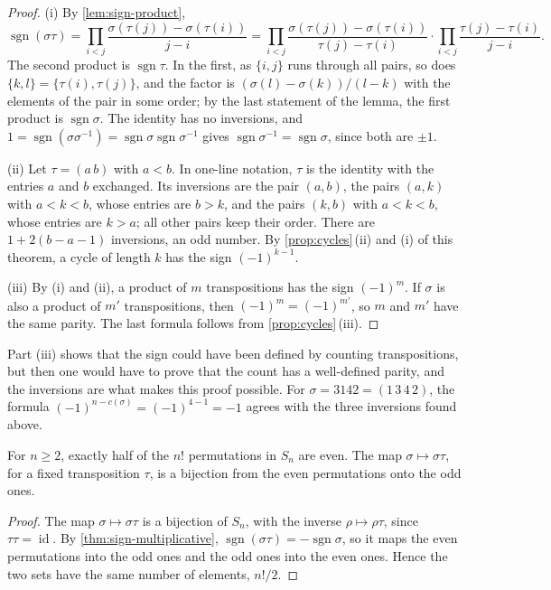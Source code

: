 \begin{proof}
(i) By \cref{lem:sign-product},
\[
\operatorname{sgn}(\sigma\tau)=\prod_{i<j}\frac{\sigma(\tau(j))-\sigma(\tau(i))}{j-i}=\prod_{i<j}\frac{\sigma(\tau(j))-\sigma(\tau(i))}{\tau(j)-\tau(i)}\cdot\prod_{i<j}\frac{\tau(j)-\tau(i)}{j-i}.
\]
The second product is $\operatorname{sgn}\tau$. In the first, as $\{i,j\}$ runs through all pairs, so does $\{k,l\}=\{\tau(i),\tau(j)\}$, and the factor is $(\sigma(l)-\sigma(k))/(l-k)$ with the elements of the pair in some order; by the last statement of the lemma, the first product is $\operatorname{sgn}\sigma$. The identity has no inversions, and $1=\operatorname{sgn}(\sigma\sigma^{-1})=\operatorname{sgn}\sigma\operatorname{sgn}\sigma^{-1}$ gives $\operatorname{sgn}\sigma^{-1}=\operatorname{sgn}\sigma$, since both are $\pm1$.

(ii) Let $\tau=(a\,b)$ with $a<b$. In one-line notation, $\tau$ is the identity with the entries $a$ and $b$ exchanged. Its inversions are the pair $(a,b)$, the pairs $(a,k)$ with $a<k<b$, whose entries are $b>k$, and the pairs $(k,b)$ with $a<k<b$, whose entries are $k>a$; all other pairs keep their order. There are $1+2(b-a-1)$ inversions, an odd number. By \cref{prop:cycles}\,(ii) and (i) of this theorem, a cycle of length $k$ has the sign $(-1)^{k-1}$.

(iii) By (i) and (ii), a product of $m$ transpositions has the sign $(-1)^m$. If $\sigma$ is also a product of $m'$ transpositions, then $(-1)^m=(-1)^{m'}$, so $m$ and $m'$ have the same parity. The last formula follows from \cref{prop:cycles}\,(iii).
\end{proof}

Part (iii) shows that the sign could have been defined by counting transpositions, but then one would have to prove that the count has a well-defined parity, and the inversions are what makes this proof possible. For $\sigma=3142=(1\,3\,4\,2)$, the formula $(-1)^{n-c(\sigma)}=(-1)^{4-1}=-1$ agrees with the three inversions found above.

\begin{corollary}
\label{cor:even-odd}
For $n\ge2$, exactly half of the $n!$ permutations in $S_n$ are even. The map $\sigma\mapsto\sigma\tau$, for a fixed transposition $\tau$, is a bijection from the even permutations onto the odd ones.
\end{corollary}

\begin{proof}
The map $\sigma\mapsto\sigma\tau$ is a bijection of $S_n$, with the inverse $\rho\mapsto\rho\tau$, since $\tau\tau=\operatorname{id}$. By \cref{thm:sign-multiplicative}, $\operatorname{sgn}(\sigma\tau)=-\operatorname{sgn}\sigma$, so it maps the even permutations into the odd ones and the odd ones into the even ones. Hence the two sets have the same number of elements, $n!/2$.
\end{proof}


